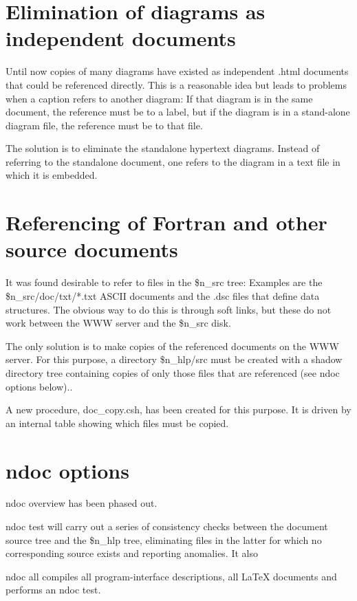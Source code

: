 \section{ Elimination of diagrams as independent documents}

	Until now copies of many diagrams have existed as independent .html
documents that could be referenced directly. This is a reasonable idea but
leads to problems when a caption refers to another diagram: If that diagram is
in the same document, the reference must be to a label, but if the diagram is
in a stand-alone diagram file, the reference must be to that file.

	The solution is to eliminate the standalone hypertext diagrams. Instead
of referring to the standalone document, one refers to the diagram in a text
file in which it is embedded.



\section{ Referencing of Fortran and other source documents}

	It was found desirable to refer to files in the \$n\_src tree: Examples
are the \$n\_src/doc/txt/*.txt ASCII documents and the .dsc files that define
data structures. The obvious way to do this is through soft links, but these do
not work between the WWW server and the \$n\_src disk.

	The only solution is to make copies of the referenced documents on the
WWW server. For this purpose, a directory \$n\_hlp/src must be created with a
shadow directory tree containing copies of only those files that are referenced
(see ndoc options below)..

	A new procedure, doc\_copy.csh, has been created for this purpose. It
is driven by an internal table showing which files must be copied.


\section{ ndoc options }

	ndoc overview has been phased out.

	ndoc test will carry out a series of consistency checks between the
document source tree and the \$n\_hlp tree, eliminating files in the latter for
which no corresponding source exists and reporting anomalies. It also

	ndoc all compiles all program-interface descriptions, all LaTeX
documents and performs an ndoc test.
